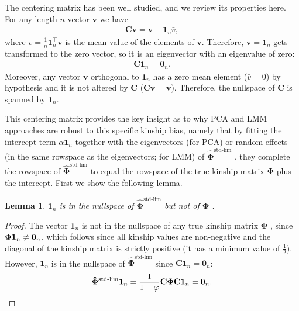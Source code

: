 \documentclass[11pt]{article}
\newcommand{\kinMat}{%
  \ensuremath{%
    \mathbf{\Phi}
  }%
  \xspace%
}%
\newcommand{\kinMatStdLim}{%
  \ensuremath{%
    \mathbf{\hat{\Phi}}^\text{std-lim}
  }%
  \xspace%
}%
\newtheorem*{lem}{Lemma}
\begin{document}
The centering matrix has been well studied, and we review its properties here.
For any length-$n$ vector $\mathbf{v}$ we have
\begin{align*}
  \mathbf{C} \mathbf{v}
  =
  \mathbf{v} - \mathbf{1}_n \bar{v}
  ,
\end{align*}
where $\bar{v} = \frac{1}{n} \mathbf{1}_n^\intercal \mathbf{v}$ is the mean value of the elements of $\mathbf{v}$.
Therefore, $\mathbf{v} = \mathbf{1}_n$ gets transformed to the zero vector, so it is an eigenvector with an eigenvalue of zero:
\begin{align*}
  \mathbf{C} \mathbf{1}_n
  =
  \mathbf{0}_n
  .
\end{align*}
Moreover, any vector $\mathbf{v}$ orthogonal to $\mathbf{1}_n$ has a zero mean element ($\bar{v} = 0$) by hypothesis and it is not altered by $\mathbf{C}$ ($\mathbf{C} \mathbf{v} = \mathbf{v}$).
Therefore, the nullspace of $\mathbf{C}$ is spanned by $\mathbf{1}_n$.

This centering matrix provides the key insight as to why PCA and LMM approaches are robust to this specific kinship bias, namely that by fitting the intercept term $\alpha \mathbf{1}_n$ together with the eigenvectors (for PCA) or random effects (in the same rowspace as the eigenvectors; for LMM) of \kinMatStdLim, they complete the rowspace of \kinMatStdLim to equal the rowspace of the true kinship matrix \kinMat plus the intercept.
First we show the following lemma.

\begin{lem}
  $\mathbf{1}_n$ is in the nullspace of \kinMatStdLim but not of \kinMat.
\end{lem}

\begin{proof}
The vector $\mathbf{1}_n$ is not in the nullspace of any true kinship matrix \kinMat, since $\kinMat \mathbf{1}_n \neq \mathbf{0}_n$, which follows since all kinship values are non-negative and the diagonal of the kinship matrix is strictly positive (it has a minimum value of $\frac{1}{2}$).
However, $\mathbf{1}_n$ is in the nullspace of \kinMatStdLim since $\mathbf{C} \mathbf{1}_n = \mathbf{0}_n$:
$$
\kinMatStdLim \mathbf{1}_n
=
\frac{1}{1 - \bar{\varphi}}
\mathbf{C} \kinMat \mathbf{C} \mathbf{1}_n
=
\mathbf{0}_n
.
$$
\end{proof}
\end{document}
